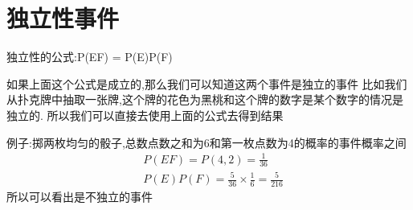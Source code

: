 \documentclass[UTF8]{ctexart}
\begin{document}
\section{独立性事件}
独立性的公式:P(EF) = P(E)P(F)
\par 
如果上面这个公式是成立的,那么我们可以知道这两个事件是独立的事件
比如我们从扑克牌中抽取一张牌,这个牌的花色为黑桃和这个牌的数字是某个数字的情况是独立的.
所以我们可以直接去使用上面的公式去得到结果

\par 
例子:掷两枚均匀的骰子,总数点数之和为6和第一枚点数为4的概率的事件概率之间
\begin{equation}
    \begin{aligned}
        &P(E F) = P({4,2}) = \frac{1}{36}\\ \nonumber
        &P(E)P(F) = \frac{5}{36}\times\frac{1}{6} = \frac{5}{216}
    \end{aligned}
\end{equation}
所以可以看出是不独立的事件
\end{document}
